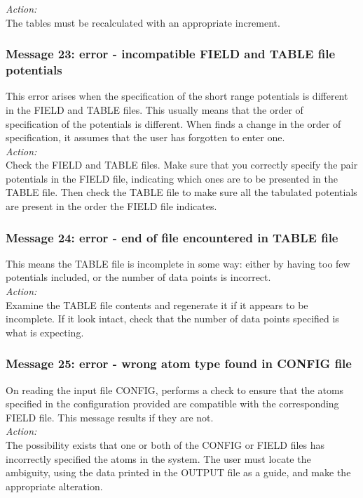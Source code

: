 \noindent
{\em Action:} \\
The tables must be recalculated with an appropriate increment.

\subsubsection*{Message 23: error - incompatible FIELD and TABLE file
potentials}

This error arises when the specification of the short range potentials
is different in the FIELD and TABLE files. This usually means that the
order of specification of the potentials is different. When
\D{} finds a change in the order of specification, it assumes
that the user has forgotten to enter one.\\

\noindent
{\em Action:} \\
Check the FIELD and TABLE files. Make sure that you correctly specify
the pair potentials in the FIELD file, indicating which ones are to be
presented in the TABLE file. Then check the TABLE file to make sure
all the tabulated potentials  are present in the order the FIELD file
indicates.

\subsubsection*{Message 24: error - end of file encountered in TABLE file}

This means the TABLE file is incomplete in some way: either by having
too few potentials included, or the number of data points is
incorrect.\\

\noindent
{\em Action:} \\
Examine the TABLE file contents and regenerate it if it appears to be
incomplete. If it look intact, check that the number of data points
specified is what \D{} is expecting.

\subsubsection*{Message 25: error - wrong atom type found in CONFIG file}

On reading the input file CONFIG, \D{} performs a check to ensure
that the atoms specified in the configuration provided are compatible
with the corresponding FIELD file. This message results if they are
not. \\ 

\noindent
{\em Action:} \\ 
The possibility exists that one or both of the CONFIG or FIELD files
has incorrectly specified the atoms in the system. The user must
locate the ambiguity, using the data printed in the OUTPUT file as a
guide, and make the appropriate alteration.

